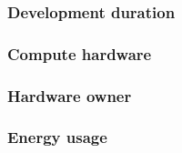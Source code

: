 \documentclass{article}
\begin{document}
\subsubsection{Development duration}


\subsubsection{Compute hardware}

\subsubsection{Hardware owner}

\subsubsection{Energy usage}
\end{document}
